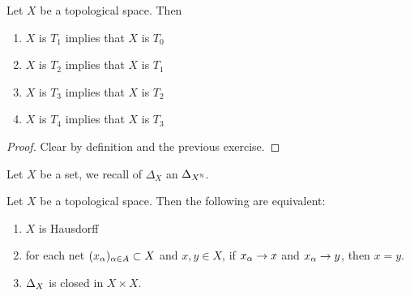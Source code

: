 \documentclass{book}
\begin{document}
	\begin{ex} 
		Let $X$ be a topological space. Then 
		\begin{enumerate}
			\item $X$ is $T_1$ implies that $X$ is $T_0$
			\item $X$ is $T_2$ implies that $X$ is $T_1$
			\item $X$ is $T_3$ implies that $X$ is $T_2$ 
			\item $X$ is $T_4$ implies that $X$ is $T_3$ 
		\end{enumerate}
	\end{ex}
	
	\begin{proof}
		Clear by definition and the previous exercise.
	\end{proof}

	\begin{note}
		Let $X$ be a set, we recall  of $\Delta_X$ an $\Delta_{X^{\mathbb{N}}}$.
	\end{note}
	
	\begin{ex} 
		Let $X$ be a topological space. Then the following are equivalent: 
		\begin{enumerate}
			\item $X$ is Hausdorff
			\item for each net $(x_{\alpha})_{\alpha \in A} \subset X$ and $x,y \in X$, if $x_{\alpha} \rightarrow x$ and $x_{\alpha} \rightarrow y$, then $x = y$.
			\item $\Delta_X$ is closed in $X \times X$.
		\end{enumerate} 
	\end{ex}
	
\end{document}

